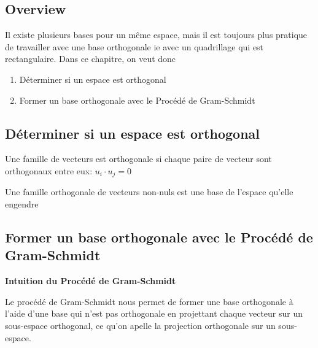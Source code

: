 \documentclass{article}
\begin{document}
\subsection{Overview}%
\label{sub:Overview}

Il existe plusieurs bases pour un même espace, mais il est toujours plus
pratique de travailler avec une base orthogonale ie avec un quadrillage qui
est rectangulaire. Dans ce chapitre, on veut donc
\begin{enumerate}
    \item Déterminer si un espace est orthogonal
    \item Former un base orthogonale avec le Procédé de Gram-Schmidt
\end{enumerate}

\subsection{Déterminer si un espace est orthogonal}

\begin{theorem}
    Une famille de vecteurs est orthogonale si chaque paire de vecteur
    sont orthogonaux entre eux: $ u_i \cdot u_j = 0 $
\end{theorem}

\begin{theorem}
    Une famille orthogonale de vecteurs non-nuls est une base de l'espace
    qu'elle engendre
\end{theorem}

\begin{theorem}
\end{theorem}

\begin{problem}
\end{problem}

\subsection{Former un base orthogonale avec le Procédé de Gram-Schmidt}

\textbf{Intuition du Procédé de Gram-Schmidt}

Le procédé de Gram-Schmidt nous permet de former une base orthogonale
à l'aide d'une base qui n'est pas orthogonale en projettant chaque
vecteur sur un sous-espace orthogonal, ce qu'on apelle la projection
orthogonale sur un sous-espace.
\end{document}
